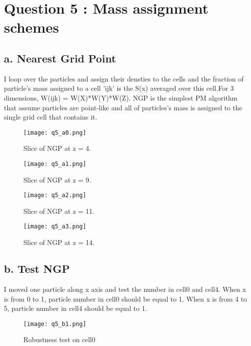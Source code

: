 \section{Question 5 : Mass assignment schemes}
\subsection{a. Nearest Grid Point}
I loop over the particles and assign their densties to the cells and the fraction of particle's mass assigned to 
a cell 'ijk' is the S(x) averaged over this cell.For 3 dimensions, W(ijk) = W(X)*W(Y)*W(Z). 
NGP is the simplest PM algorithm that assume particles are point-like and all of particles's mass is assigned to 
the single grid cell that contains it.




\begin{figure}
  \centering
  \texttt{[image: q5\_a0.png]}
  \caption{Slice of NGP at z = 4.}
  \label{fig:NGP4}
\end{figure}

\begin{figure}
  \centering
  \texttt{[image: q5\_a1.png]}
  \caption{Slice of NGP at z = 9.}
  \label{fig:NGP9}
\end{figure}

\begin{figure}
  \centering
  \texttt{[image: q5\_a2.png]}
  \caption{Slice of NGP at z = 11.}
  \label{fig:NGP11}
\end{figure}

\begin{figure}
  \centering
  \texttt{[image: q5\_a3.png]}
  \caption{Slice of NGP at z = 14.}
  \label{fig:NGP14}
\end{figure}


\subsection{b. Test NGP}
I moved one particle along x axis and test the number in cell0 and cell4.
When x is from 0 to 1, particle number in cell0 should be equal to 1.
When x is from 4 to 5, particle number in cell4 should be equal to 1.


\begin{figure}
  \centering
  \texttt{[image: q5\_b1.png]}
  \caption{Robustness test on cell0}
  \label{fig:cell0}
\end{figure}

